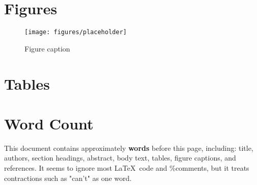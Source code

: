 \begin{wordcount}


\newpage
\section*{Figures}

\begin{figure}[ht!]
\centering\texttt{[image: figures/placeholder]}
\caption{Figure caption}
\end{figure}



\newpage
\section*{Tables}



\newpage





\newpage
\end{wordcount}
\section*{Word Count}

This document contains approximately {\large \textbf{ words}} before this page, including: title, authors, section headings, abstract, body text, tables, figure captions, and references. It seems to ignore most \LaTeX \ code and \%comments, but it treats contractions such as "can't" as one word.


